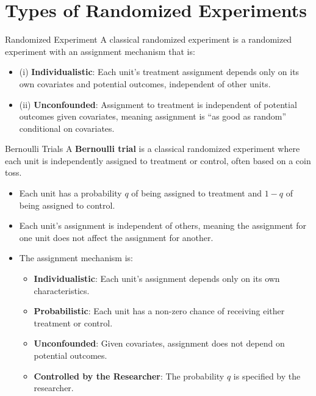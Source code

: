 \documentclass[xcolor=svgnames,t]{beamer}
\begin{document}
\section{Types of Randomized Experiments}


\begin{frame}{Randomized Experiment}
    A classical randomized experiment is a randomized experiment with an assignment mechanism that is:
    
    \begin{itemize}
        \item (i) \textbf{Individualistic}: Each unit’s treatment assignment depends only on its own covariates and potential outcomes, independent of other units.
        \pause
        \item (ii) \textbf{Unconfounded}: Assignment to treatment is independent of potential outcomes given covariates, meaning assignment is “as good as random” conditional on covariates.
    \end{itemize}
\end{frame}

\begin{frame}{Bernoulli Trials}
    A \textbf{Bernoulli trial} is a classical randomized experiment where each unit is independently assigned to treatment or control, often based on a coin toss.
    
    \begin{itemize}
        \item Each unit has a probability \( q \) of being assigned to treatment and \( 1 - q \) of being assigned to control.
       \pause
        \item Each unit's assignment is independent of others, meaning the assignment for one unit does not affect the assignment for another.
        \pause 
        \item The assignment mechanism is:
            \begin{itemize}
                \item \textbf{Individualistic}: Each unit's assignment depends only on its own characteristics.
                \item \textbf{Probabilistic}: Each unit has a non-zero chance of receiving either treatment or control.
                \item \textbf{Unconfounded}: Given covariates, assignment does not depend on potential outcomes.
                \item \textbf{Controlled by the Researcher}: The probability \( q \) is specified by the researcher.
            \end{itemize}
    \end{itemize}
\end{frame}
\end{document}
